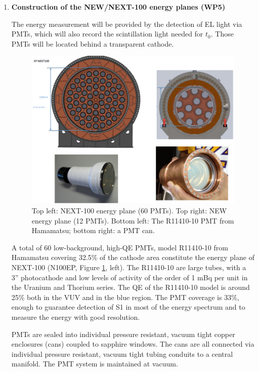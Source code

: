 \begin{enumerate}
\item {\bf Construction of the NEW/NEXT-100 energy planes (WP5)}

The energy measurement will be provided by the detection of EL light via PMTs, which will also record the scintillation light needed for $t_0$. Those PMTs will be located behind a transparent cathode.

\begin{figure}[t!b!]
\begin{center}
\includegraphics[width=.9\textwidth]{img/EPNext-100.png}
\end{center}
\caption{Top left: NEXT-100 energy plane (60 PMTs). Top right: NEW energy plane (12 PMTs).
Bottom left: The R11410-10 PMT from Hamamatsu; bottom right: a PMT can.} \label{fig:EnergyPlane}
\end{figure}

A total of 60 low-background, high-QE PMTs, model R11410-10 from Hamamatsu covering 32.5\% of the cathode area constitute the energy plane of NEXT-100 (N100EP, Figure \ref{fig:EnergyPlane}, left). The R11410-10 are large tubes, with a 3'' photocathode and low levels of  activity of the order of 1 mBq per unit in the Uranium and Thorium series. The QE of the R11410-10 model is around 25\% both in the VUV and in the blue region. The  PMT coverage is 33\%, enough to guarantee detection of S1 in most of the energy spectrum and to measure the energy with good resolution.

PMTs are sealed into individual pressure resistant, vacuum tight copper enclosures (cans) coupled to 
sapphire windows. The cans are all connected via individual pressure resistant, vacuum tight tubing conduits to a central manifold. The PMT system is maintained at vacuum.


\end{enumerate}
